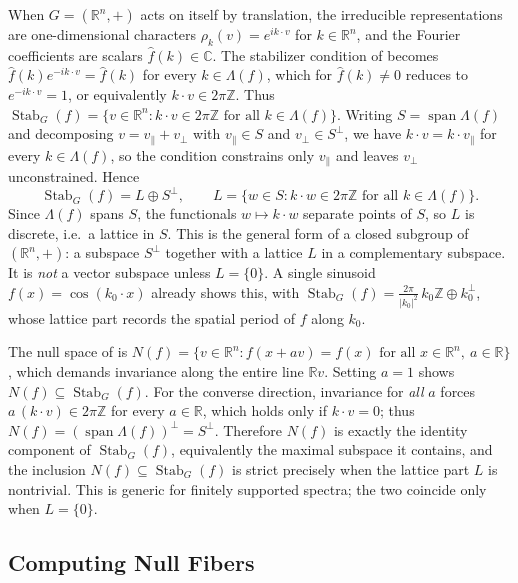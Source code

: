 \documentclass[11pt]{article}
\DeclareMathOperator{\Stab}{Stab}
\newcommand{\CC}{\mathbb{C}}
\newcommand{\RR}{\mathbb{R}}
\newcommand{\ZZ}{\mathbb{Z}}
\newcommand{\fhat}{\hat{f}}
\begin{document}
When $G = (\RR^n, +)$ acts on itself by translation, the irreducible representations are one-dimensional characters $\rho_k(v) = e^{ik \cdot v}$ for $k \in \RR^n$, and the Fourier coefficients are scalars $\fhat(k) \in \CC$. The stabilizer condition of  becomes $\fhat(k) e^{-ik \cdot v} = \fhat(k)$ for every $k \in \Lambda(f)$, which for $\fhat(k) \neq 0$ reduces to $e^{-ik \cdot v} = 1$, or equivalently $k \cdot v \in 2\pi\ZZ$. Thus $\Stab_G(f) = \{v\in\RR^n : k\cdot v\in 2\pi\ZZ \text{ for all } k\in\Lambda(f)\}$. Writing $S=\operatorname{span}\Lambda(f)$ and decomposing $v=v_\parallel+v_\perp$ with $v_\parallel\in S$ and $v_\perp\in S^\perp$, we have $k\cdot v=k\cdot v_\parallel$ for every $k\in\Lambda(f)$, so the condition constrains only $v_\parallel$ and leaves $v_\perp$ unconstrained. Hence
\begin{equation}
  \Stab_G(f) = L \oplus S^\perp,
  \qquad
  L = \{w\in S : k\cdot w\in 2\pi\ZZ \text{ for all } k\in\Lambda(f)\}.
\end{equation}
Since $\Lambda(f)$ spans $S$, the functionals $w\mapsto k\cdot w$ separate points of $S$, so $L$ is discrete, i.e.\ a lattice in $S$. This is the general form of a closed subgroup of $(\RR^n,+)$: a subspace $S^\perp$ together with a lattice $L$ in a complementary subspace. It is \emph{not} a vector subspace unless $L=\{0\}$. A single sinusoid $f(x)=\cos(k_0\cdot x)$ already shows this, with $\Stab_G(f) = \tfrac{2\pi}{\lvert k_0\rvert^2}\,k_0\ZZ \oplus k_0^\perp$, whose lattice part records the spatial period of $f$ along $k_0$.

The null space of \cite{li2025null} is $N(f)=\{v\in\RR^n : f(x+av)=f(x)\text{ for all } x\in\RR^n,\ a\in\RR\}$, which demands invariance along the entire line $\RR v$. Setting $a=1$ shows $N(f)\subseteq\Stab_G(f)$. For the converse direction, invariance for \emph{all} $a$ forces $a\,(k\cdot v)\in 2\pi\ZZ$ for every $a\in\RR$, which holds only if $k\cdot v=0$; thus $N(f) = (\operatorname{span}\Lambda(f))^\perp = S^\perp$. Therefore $N(f)$ is exactly the identity component of $\Stab_G(f)$, equivalently the maximal subspace it contains, and the inclusion $N(f)\subseteq\Stab_G(f)$ is strict precisely when the lattice part $L$ is nontrivial. This is generic for finitely supported spectra; the two coincide only when $L=\{0\}$.

\subsection{Computing Null Fibers}\label{sec:computation}
\end{document}
